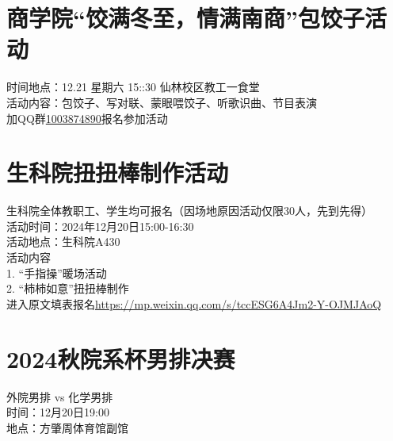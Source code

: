 \documentclass[letterpaper, 12pt]{article}
\begin{document}
\begin{multicols}{2}
\section{商学院“饺满冬至，情满南商”包饺子活动}
时间地点：12.21 星期六 15::30 仙林校区教工一食堂\\
活动内容：包饺子、写对联、蒙眼喂饺子、听歌识曲、节目表演\\
加QQ群\url{1003874890}报名参加活动\\

\section{生科院扭扭棒制作活动}
生科院全体教职工、学生均可报名（因场地原因活动仅限30人，先到先得）\\
活动时间：2024年12月20日15:00-16:30\\
活动地点：生科院A430\\
活动内容\\
1. “手指操”暖场活动\\
2. “柿柿如意”扭扭棒制作\\
进入原文填表报名\url{https://mp.weixin.qq.com/s/tccESG6A4Jm2-Y-OJMJAoQ}\\
\section{2024秋院系杯男排决赛}
外院男排 vs 化学男排\\
时间：12月20日19:00\\
地点：方肇周体育馆副馆\\
\end{multicols} 
\end{document}
